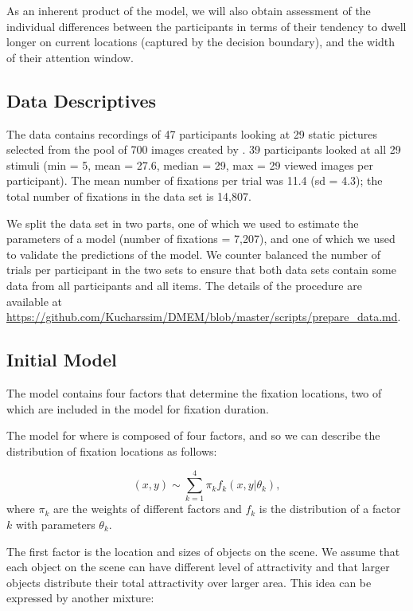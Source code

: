 \documentclass{article}
\begin{document}
As an inherent product of the model, we will also obtain assessment of the individual differences between the participants in terms of their tendency to dwell longer on current locations (captured by the decision boundary), and the width of their attention window.

\subsection{Data Descriptives}

The data contains recordings of 47 participants looking at 29 static pictures selected from the pool of 700 images created by \citet{xu2014beyond}. 39 participants looked at all 29 stimuli (min = 5, mean = 27.6, median = 29, max = 29 viewed images per participant). The mean number of fixations per trial was 11.4 (sd = 4.3); the total number of fixations in the data set is 14,807.

We split the data set in two parts, one of which we used to estimate the parameters of a model (number of fixations = 7,207), and one of which we used to validate the predictions of the model. We counter balanced the number of trials per participant in the two sets to ensure that both data sets contain some data from all participants and all items. The details of the procedure are available at \url{https://github.com/Kucharssim/DMEM/blob/master/scripts/prepare\_data.md}. 

\subsection{Initial Model}

The model contains four factors that determine the fixation locations, two of which are included in the model for fixation duration.

The model for where is composed of four factors, and so we can describe the distribution of fixation locations as follows:

\begin{equation}
    (x, y) \sim \sum_{k=1}^4 \pi_k f_k(x, y | \theta_k),
\end{equation}
where $\pi_k$ are the weights of different factors and $f_k$ is the distribution of a factor $k$ with parameters $\theta_k$.

The first factor is the location and sizes of objects on the scene. We assume that each object on the scene can have different level of attractivity and that larger objects distribute their total attractivity over larger area. This idea can be expressed by another mixture:
\end{document}
